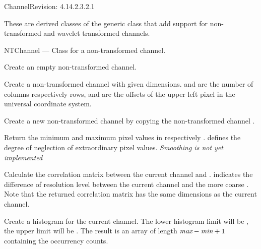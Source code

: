 \begin{manpage}{\libtitle}{Channel}{$ $Revision: 4.14.2.3.2.1 $ $}

\separator

\subtitle{Derived \\ Classes}
    These are derived classes of the generic  class that
    add support for non-transformed and wavelet transformed channels.


\separator

\subtitle{Name}
    NTChannel --- Class for a non-transformed channel.


\subtitle{Declaration}

    Create an empty non-transformed channel.

    Create a non-transformed channel with given dimensions.  and
     are the number of columns respectively rows,  and
     are the offsets of the upper left pixel in the universal
    coordinate system.

    Create a new non-transformed channel by copying the non-transformed channel
    .


\subtitle{Public \\ Operations}

    Return the minimum and maximum pixel values in  respectively
    .  defines the degree of neglection of
    extraordinary pixel values.
    \emph{Smoothing is not yet implemented}

    Calculate the correlation matrix between the current channel and
    .  indicates the difference of resolution level
    between the current channel and the more coarse . Note that
    the returned correlation matrix has the same dimensions as the current
    channel.

    Create a histogram for the current channel. The lower histogram limit will
    be , the upper limit will be . The result is an array
    of length $\emph{max}-\emph{min}+1$ containing the occurrency counts.


\end{manpage}
